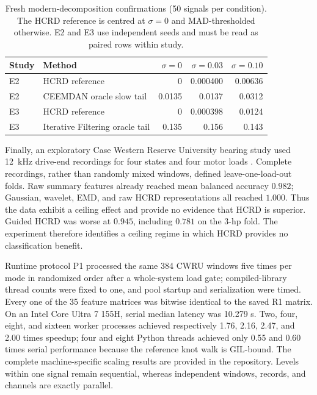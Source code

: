 \begin{table}[H]
\centering
\caption{Fresh modern-decomposition confirmations (50 signals per condition).
The HCRD reference is centred at $\sigma=0$ and MAD-thresholded otherwise.
E2 and E3 use independent seeds and must be read as paired rows within study.}
\label{tab:modern-decomposition}
\begin{tabular}{llrrr}
\toprule
Study & Method & $\sigma=0$ & $\sigma=0.03$ & $\sigma=0.10$ \\
\midrule
E2 & HCRD reference & 0 & 0.000400 & 0.00636 \\
E2 & CEEMDAN oracle slow tail & 0.0135 & 0.0137 & 0.0312 \\
\addlinespace
E3 & HCRD reference & 0 & 0.000398 & 0.0124 \\
E3 & Iterative Filtering oracle tail & 0.135 & 0.156 & 0.143 \\
\bottomrule
\end{tabular}
\end{table}

Finally, an exploratory Case Western Reserve University bearing study used
12~kHz drive-end recordings for four states and four motor loads
\citep{smith2015cwru}.  Complete recordings, rather than randomly mixed
windows, defined leave-one-load-out folds.  Raw summary features already
reached mean balanced accuracy $0.982$; Gaussian, wavelet, EMD, and raw HCRD
representations all reached $1.000$.  Thus the data exhibit a ceiling effect
and provide no evidence that HCRD is superior.  Guided HCRD was worse at
$0.945$, including $0.781$ on the 3-hp fold.  The experiment therefore
identifies a ceiling regime in which HCRD provides no classification benefit.

Runtime protocol P1 processed the same 384 CWRU windows five times per mode in
randomized order after a whole-system load gate; compiled-library thread counts
were fixed to one, and pool startup and serialization were timed. Every one of
the 35 feature
matrices was bitwise identical to the saved R1 matrix.  On an Intel Core Ultra
7 155H, serial median latency was 10.279 s.  Two, four, eight, and sixteen
worker processes achieved respectively 1.76, 2.16, 2.47, and 2.00 times
speedup; four and eight Python threads achieved only 0.55 and 0.60 times serial
performance because the reference knot walk is GIL-bound. The complete
machine-specific scaling results are provided in the repository. Levels
within one signal remain
sequential, whereas independent windows, records, and channels are exactly
parallel.

